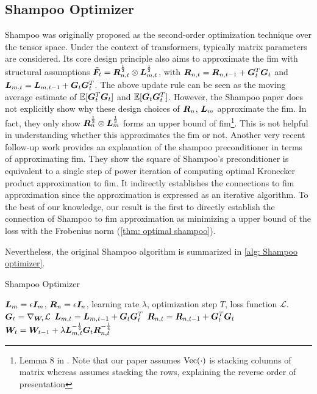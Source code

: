 \subsection{Shampoo Optimizer}
\label{subapp: Shampoo optimizer}
Shampoo \citep{gupta2018shampoo} was originally proposed as the second-order optimization technique over the tensor space. Under the context of transformers, typically matrix parameters are considered. Its core design principle also aims to approximate the \gls{fim} with structural assumptions $\tilde{\bm{F}}_t={\bm{R}}_{n,t}^{\frac{1}{2}}\otimes {\bm{L}}_{m,t}^{\frac{1}{2}}$, with ${\bm{R}}_{n,t} = {\bm{R}}_{n,t-1}+ {\bm{G}}_t^T{\bm{G}}_t$ and ${\bm{L}}_{m,t} = {\bm{L}}_{m,t-1}+ {\bm{G}}_t{\bm{G}}_t^T$. The above update rule can be seen as the moving average estimate of $\mathbb{E}[{\bm{G}}_t^T{\bm{G}}_t]$ and $\mathbb{E}[{\bm{G}}_t{\bm{G}}_t^T]$.
However, the Shampoo paper \citep{gupta2018shampoo} does not explicitly show why these design choices of ${\bm{R}}_n$, ${\bm{L}}_m$ approximate the \gls{fim}. In fact, they only show ${\bm{R}}_n^{\frac{1}{2}}\otimes {\bm{L}}_m^{\frac{1}{2}}$ forms an upper bound of \gls{fim}\footnote{Lemma 8 in \citep{gupta2018shampoo}. Note that our paper assumes $\operatorname{Vec}(\cdot)$ is stacking columns of matrix whereas \cite{gupta2018shampoo} assumes stacking the rows, explaining the reverse order of presentation}. This is not helpful in understanding whether this approximates the \gls{fim} or not. Another very recent follow-up work \citep{morwani2024new} provides an explanation of the shampoo preconditioner in terms of approximating \gls{fim}. They show the square of Shampoo's preconditioner is equivalent to a single step of power iteration of computing optimal Kronecker product approximation to \gls{fim}. It indirectly establishes the connections to \gls{fim} approximation since the approximation is expressed as an iterative algorithm. To the best of our knowledge, our result is the first to directly establish the connection of Shampoo to \gls{fim} approximation as minimizing a upper bound of the loss with the Frobenius norm (\cref{thm: optimal shampoo}). 

Nevertheless, the original Shampoo algorithm is summarized in \cref{alg: Shampoo optimizer}. 

\begin{algorithm}
    \caption{Shampoo Optimizer}
    \label{alg: Shampoo optimizer}
    \begin{algorithmic}
         ${\bm{L}}_m=\epsilon{\bm{I}}_m$, ${\bm{R}}_n=\epsilon{\bm{I}}_n$, learning rate $\lambda$, optimization step $T$, loss function $\mathcal{L}$.
            \STATE ${\bm{G}}_t=\nabla_{{\bm{W}}_t}\mathcal{L}$
            \STATE ${\bm{L}}_{m,t}={\bm{L}}_{m,t-1}+{\bm{G}}_t{\bm{G}}_t^T$
            \STATE ${\bm{R}}_{n,t}={\bm{R}}_{n,t-1}+{\bm{G}}_t^T{\bm{G}}_t$
            \STATE ${\bm{W}}_{t}={\bm{W}}_{t-1}+\lambda {\bm{L}}_{m,t}^{-\frac{1}{4}}{\bm{G}}_t{\bm{R}}_{n,t}^{-\frac{1}{4}}$
        \ENDFOR
    \end{algorithmic}
\end{algorithm}

